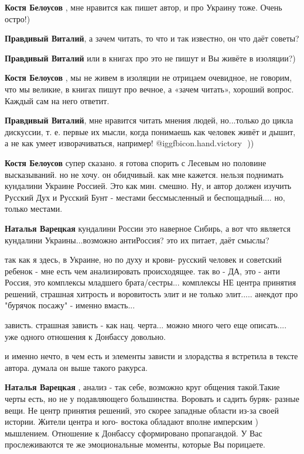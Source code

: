 \begin{itemize}
\begin{itemize}
\textbf{Костя Белоусов} , мне нравится как пишет автор, и про Украину тоже.
Очень остро!)

\textbf{Правдивый Виталий}, а зачем читать, то что и так известно, он что даёт советы?

\textbf{Правдивый Виталий} или в книгах про это не пишут и Вы живёте в изоляции?)

\textbf{Костя Белоусов} , мы не живем в изоляции не отрицаем очевидное, не говорим, что мы великие, в книгах пишут про вечное, а «зачем читать», хороший вопрос.
Каждый сам на него ответит.

\textbf{Правдивый Виталий}, мне нравится читать мнения людей, но...только до цикла дискуссии, т. е. первые их мысли, когда понимаешь как человек живёт и дышит, а не как умеет изворачиваться, например! @igg{fbicon.hand.victory} ️ ))

\textbf{Костя Белоусов} супер сказано. я готова спорить с Лесевым но половине высказываний. но не хочу. он обидчивый. как мне кажется. нельзя поднимать кундалини Украине Россией.
Это как мин. смешно.
Ну, и автор должен изучить Русский Дух и Русский Бунт - местами бессмысленный и беспощадный.... но, только местами.

\textbf{Наталья Варецкая} кундалини России это наверное Сибирь, а вот что является кундалини Украины...возможно антиРоссия? это их питает, даёт смыслы?


так как я здесь, в Украине, но по духу и крови- русский человек и советский
ребенок - мне есть чем анализировать происходящее. так во - ДА, это - анти
Россия, это комплексы младшего брата/сестры... комплексы НЕ центра принятия
решений, страшная хитрость и воровитость элит и не только элит..... анекдот про
"бурячок посажу" - именно вмасть...

зависть. страшная зависть - как нац. черта... можно много чего еще описать....
уже одного отношения к Донбассу довольно.

и именно нечто, в чем есть и элементы зависти и злорадства я встретила в тексте
автора. думала он выше такого ракурса.


\textbf{Наталья Варецкая} , анализ - так себе, возможно круг общения такой.Такие черты есть, но не у подавляющего большинства.
Воровать и садить буряк- разные вещи.
Не центр принятия решений, это скорее западные области из-за своей истории.
Жители центра и юго- востока обладают вполне имперским ) мышлением.
Отношение к Донбассу сформировано пропагандой.
У Вас прослеживаются те же эмоциональные моменты, которые Вы порицаете.


\end{itemize}
\end{itemize}
